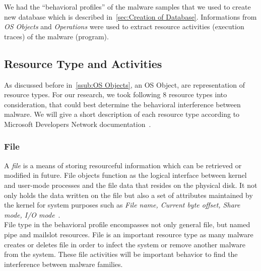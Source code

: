 We had the ``behavioral profiles'' of the malware samples that we used to create new database which is described in~\autoref{sec:Creation of Database}.
Informations from \emph{OS Objects} and \emph{Operations} were used to extract resource activities (execution traces) of the malware (program).

\subsection{Resource Type and Activities}
\label{sub:Resource Types and Activities}
As discussed before in~\autoref{ssub:OS Objects}, an OS Object, are representation of resource types.
For our research, we took following 8 resource types into consideration, that could best determine the behavioral interference between malware.
We will give a short description of each resource type according to Microsoft Developers Network documentation~\cite[MSDN]{msdn}.
\subsubsection{File}
\label{ssub:File}
A \emph{file} is a means of storing resourceful information which can be retrieved or modified in future.
File objects function as the logical interface between kernel and user-mode processes and the file data that resides on the physical disk.
It not only holds the data written on the file but also a set of attributes maintained by the kernel for system purposes such as \emph{File name, Current byte offset, Share mode, I/O mode}~\cite[]{msfile}.\\
File type in the behavioral profile encompasses not only general file, but named pipe and mailslot resources.
File is an important resource type as many malware creates or deletes file in order to infect the system or remove another malware from the system.
These file activities will be important behavior to find the interference between malware families.
